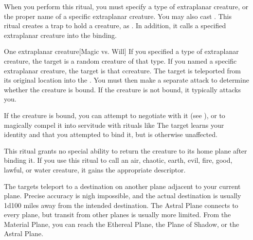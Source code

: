 \spellspecial When you perform this ritual, you must specify a type of extraplanar creature, or the proper name of a specific extraplanar creature. You may also cast .
\spellline
\spelleffect This ritual creates a trap to hold a creature, as . In addition, it calls a specified extraplanar creature into the binding.
\begin{spelltarget}{One extraplanar creature}[Magic vs. Will]
    \spellspecial If you specified a type of extraplanar creature, the target is a random creature of that type. If you named a specific extraplanar creature, the target is that ccreature.
    \spellsuccess The target is teleported from its original location into the . You must then make a separate attack to determine whether the creature is bound. If the creature is not bound, it typically attacks you.

    If the creature is bound, you can attempt to negotiate with it (see ), or to magically compel it into servitude with rituals like 
    \spellfailure The target learns your identity and that you attempted to bind it, but is otherwise unaffected.
\end{spelltarget}
\spellnotes This ritual grants no special ability to return the creature to its home plane after binding it. If you use this ritual to call an air, chaotic, earth, evil, fire, good, lawful, or water creature, it gains the appropriate descriptor.

\spelleffect The targets teleport to a destination on another plane adjacent to your current plane. Precise accuracy is nigh impossible, and the actual destination is usually 1d100 miles away from the intended destination.
\spellnotes The Astral Plane connects to every plane, but transit from other planes is usually more limited. From the Material Plane, you can reach the Ethereal Plane, the Plane of Shadow, or the Astral Plane.

